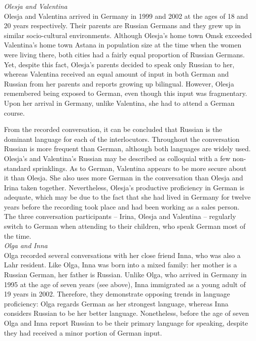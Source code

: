 \noindent \textit{Olesja and Valentina}\\
Olesja and Valentina arrived in Germany in 1999 and 2002 at the ages of 18 and 20 years respectively. Their parents are Russian Germans and they grew up in similar socio-cultural environments. Although Olesja's home town Omsk exceeded Valentina's home town Astana in population size at the time when the women were living there, both cities had a fairly equal proportion of Russian Germans. Yet, despite this fact, Olesja's parents decided to speak only Russian to her, whereas Valentina received an equal amount of input in both German and Russian from her parents and reports growing up bilingual. However, Olesja remembered being exposed to German, even though this input was fragmentary. Upon her arrival in Germany, unlike Valentina, she had to attend a German course.

From the recorded conversation, it can be concluded that Russian is the dominant language for each of the interlocutors. Throughout the conversation Russian is more frequent than German, although both languages are widely used. Olesja's and Valentina's Russian may be described as colloquial with a few non-standard sprinklings. As to German, Valentina appears to be more secure about it than Olesja. She also uses more German in the conversation than Olesja and Irina taken together. Nevertheless, Olesja's productive proficiency in German is adequate, which may be due to the fact that she had lived in Germany for twelve years before the recording took place and had been working as a sales person. The three conversation participants  --  Irina, Olesja and Valentina  --  regularly switch to German when attending to their children, who speak German most of the time.\\ 

\noindent \textit{Olga and Inna}\\
Olga recorded several conversations with her close friend Inna, who was also a Lahr resident. Like Olga, Inna was born into a mixed family: her mother is a Russian German, her father is Russian. Unlike Olga, who arrived in Germany in 1995 at the age of seven years (see above), Inna immigrated as a young adult of 19 years in 2002. Therefore, they demonstrate opposing trends in language proficiency: Olga regards German as her strongest language, whereas Inna considers  Russian to be her better language. Nonetheless, before the age of seven Olga and Inna report Russian to be their primary language for speaking, despite they had received a minor portion of German input.

